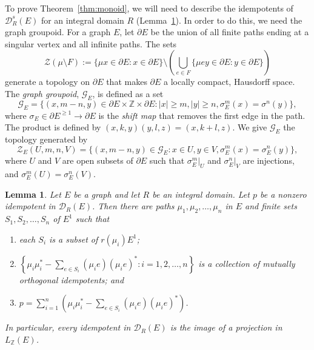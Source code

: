 \documentclass[11pt, letterpaper,final]{amsart}
\newcommand{\ZZ}{\mathbb{Z}}
\newcommand{\D}{\mathcal{D}}
\newtheorem{lem}[thm]{Lemma}
\theoremstyle{definition}
\theoremstyle{remark}
\begin{document}
To prove Theorem~\ref{thm:monoid}, we will need to describe the idempotents of $\D^s_R(E)$ for an integral domain $R$ (Lemma~\ref{lem:diag-proj-graph}).  In order to do this, we need the graph groupoid.  For a graph $E$, let $\partial E$ be the union of all finite paths ending at a singular vertex and all infinite paths.  The sets
\[\mathcal{Z}(\mu \setminus F) := \{ \mu x \in \partial E : x \in \partial E\} \setminus \left( \bigcup_{ e \in F } \{ \mu e y \in \partial E : y \in \partial E \} \right)\]
generate a topology on $\partial E$ that makes $\partial E$ a locally compact, Hausdorff space.  The \emph{graph groupoid}, $\mathcal{G}_E$, is defined as a set
\[
\mathcal{G}_E = \{ (x, m-n, y) \in \partial E \times \ZZ \times \partial E : |x| \geq m, |y| \geq n, \sigma_E^m(x) = \sigma^n(y) \},
\]
where $\sigma_E \in \partial E^{\geq 1} \to \partial E$ is the \emph{shift map} that removes the first edge in the path.  The product is defined by $(x,k, y)(y,l,z) = (x, k+l, z)$.  We give $\mathcal{G}_E$ the topology generated by 
\[
\mathcal{Z}_E(U, m, n, V) = \{ (x,m-n,y) \in \mathcal{G}_E : x \in U, y \in V, \sigma_E^m(x)=\sigma_E^n(y) \},
\]
where $U$ and $V$ are open subsets of $\partial E$ such that $\sigma_E^m \vert_{U}$ and $\sigma_E^n \vert_{V}$ are injections, and $\sigma_E^m(U)=\sigma_E^n(V)$.

\begin{lem}\label{lem:diag-proj-graph}
Let $E$ be a graph and let $R$ be an integral domain.  Let $p$ be a nonzero idempotent in $\D_R(E)$.  Then there are paths $\mu_1, \mu_2, \ldots, \mu_n$ in $E$ and finite sets $S_1, S_2, \ldots, S_n$ of $E^1$ such that 
\begin{enumerate}
    \item each $S_i$ is a subset of $r(\mu_i) E^1$;

    \item $\left\{\mu_i \mu_i ^* - \sum_{ e \in S_i } (\mu_i e) (\mu_i e)^* : i =1, 2, \ldots, n \right\}$ is a collection of mutually orthogonal idempotents; and 

    \item $p = \sum_{ i = 1}^n \left(\mu_i \mu_i^* - \sum_{ e \in S_i } (\mu_i e) (\mu_i e)^* \right)$.
\end{enumerate}
In particular, every idempotent in $\D_R(E)$ is the image of a projection in $L_\ZZ(E)$.
\end{lem}
\end{document}
